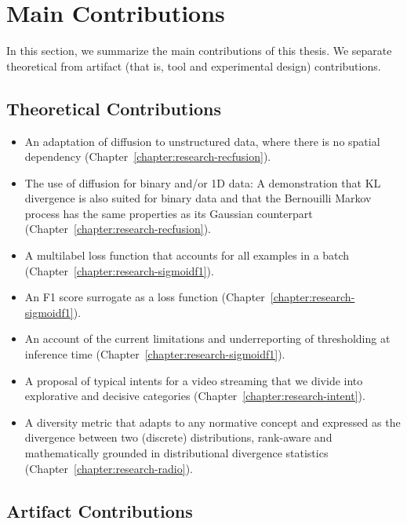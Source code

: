 
\section{Main Contributions}
\label{section:introduction:contributions}

In this section, we summarize the main contributions of this thesis. We separate theoretical from artifact (that is, tool and experimental design) contributions.

\subsection*{Theoretical Contributions}

\begin{itemize}
\item An adaptation of diffusion to unstructured data, where there is no spatial dependency (Chapter~\ref{chapter:research-recfusion}).
\item The use of diffusion for binary and/or 1D data: A demonstration that KL divergence is also suited for binary data and that the Bernouilli Markov process has the same properties as its Gaussian counterpart (Chapter~\ref{chapter:research-recfusion}).
\item A multilabel loss function that accounts for all examples in a batch (Chapter~\ref{chapter:research-sigmoidf1}).
\item An F1 score surrogate as a loss function (Chapter~\ref{chapter:research-sigmoidf1}).
\item An account of the current limitations and underreporting of thresholding at inference time (Chapter~\ref{chapter:research-sigmoidf1}).
\item A proposal of typical intents for a video streaming that we divide into explorative and decisive categories (Chapter~\ref{chapter:research-intent}).
\item A diversity metric that adapts to any normative concept and expressed as the divergence between two (discrete) distributions, rank-aware and mathematically grounded in distributional divergence statistics (Chapter~\ref{chapter:research-radio}).
\end{itemize}

\subsection*{Artifact Contributions}

